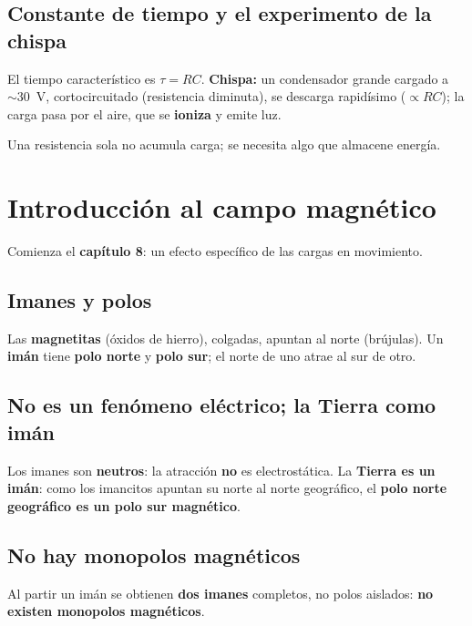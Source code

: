 \documentclass[12pt,a4paper]{article}
\begin{document}
\subsection{Constante de tiempo y el experimento de la chispa}

El tiempo característico es $\tau = RC$. \textbf{Chispa:} un condensador
grande cargado a $\sim 30$~V, cortocircuitado (resistencia diminuta), se
descarga rapidísimo ($\propto RC$); la carga pasa por el aire, que se
\textbf{ioniza} y emite luz.

\begin{notebox}
  Una resistencia sola no acumula carga; se necesita algo que almacene
  energía.
\end{notebox}

\section{Introducción al campo magnético}

Comienza el \textbf{capítulo 8}: un efecto específico de las cargas en
movimiento.

\subsection{Imanes y polos}

Las \textbf{magnetitas} (óxidos de hierro), colgadas, apuntan al norte
(brújulas). Un \textbf{imán} tiene \textbf{polo norte} y \textbf{polo
sur}; el norte de uno atrae al sur de otro.

\subsection{No es un fenómeno eléctrico; la Tierra como imán}

Los imanes son \textbf{neutros}: la atracción \textbf{no} es
electrostática. La \textbf{Tierra es un imán}: como los imancitos apuntan
su norte al norte geográfico, el \textbf{polo norte geográfico es un polo
sur magnético}.

\subsection{No hay monopolos magnéticos}

Al partir un imán se obtienen \textbf{dos imanes} completos, no polos
aislados: \textbf{no existen monopolos magnéticos}.
\end{document}
